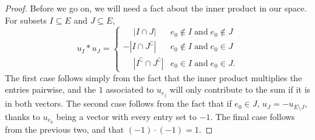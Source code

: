 \documentclass[12pt,oneside]{../../sfsuthesis}
\begin{document}
\begin{proof}
    Before we go on, we will need a fact about the inner product in our space.
    For subsets \( I \subseteq E \) and \( J \subseteq E \),
    \[
        u_{I} \ast u_{J} = \begin{cases}
            \phantom{-} | I \cap J |                         & e_0 \notin I \; \text{and} \; e_0 \notin J \\
            - | I \cap J^\complement |                       & e_0 \notin I \; \text{and} \; e_0 \in J    \\
            \phantom{-} | I^\complement \cap J^\complement | & e_0 \in I \; \text{and} \; e_0 \in J.
        \end{cases}
    \]
    The first case follows simply from the fact that the inner product multiplies the entries pairwise, and the \( 1 \) associated to \( u_{e_j} \) will only contribute to the sum if it is in both vectors.
    The second case follows from the fact that if \( e_0 \in J \),  \( u_J = - u_{E \setminus J} \), thanks to \( u_{e_0} \) being a vector with every entry set to \( -1 \).
    The final case follows from the previous two, and that \( (-1) \cdot (-1) = 1 \).


\end{proof}
\end{document}

